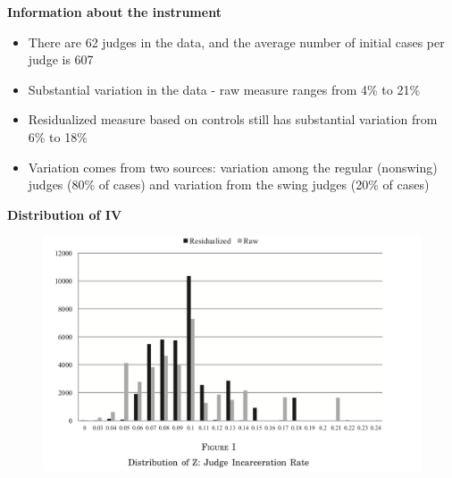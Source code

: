 \documentclass[notes=show]{beamer}
\begin{document}
\begin{frame}[plain]
\begin{center}
\textbf{Information about the instrument}
\end{center}

\begin{itemize}
	\item There are 62 judges in the data, and the average number of initial cases per judge is 607
	\item Substantial variation in the data - raw measure ranges from 4\% to 21\%
	\item Residualized measure based on controls still has substantial variation from 6\% to 18\%
	\item Variation comes from two sources: variation among the regular (nonswing) judges (80\% of cases) and variation from the swing judges (20\% of cases)
\end{itemize}

\end{frame}

\begin{frame}[plain]

	\begin{center}
	\textbf{Distribution of IV}
	\end{center}
	
	\begin{figure}
	\includegraphics[scale=0.15]{./lecture_includes/iv.png}
	\end{figure}
\end{frame}
	
\end{document}
